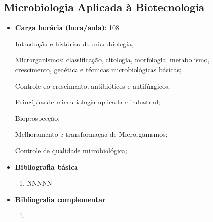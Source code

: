 \documentclass[11pt,fleqn]{book} %
\newcommand{\VER}[1]{\begingroup\color{red}#1\endgroup}
\begin{document}
\subsection{Microbiologia Aplicada à Biotecnologia}\label{disc:microbiologia}
\begin{itemize}
	\item \textbf{Carga horária (hora/aula):} 108
	
%	
%	
%	
%	
%	
%	
%	
	Introdução e histórico da microbiologia; 
	
	Microrganismos: classificação, citologia, morfologia, metabolismo, crescimento,  genética e técnicas microbiológicas básicas;
	
	Controle do crescimento, antibióticos e antifúngicos;
	
	Princípios de microbiologia aplicada e industrial; 
	
	Bioprospecção;
	
	Melhoramento e transformação de Microrganismos; 
		
	Controle de qualidade microbiológica;	
	
	\item \textbf{Bibliografia básica}
	\begin{enumerate}
		\item NNNNN
	\end{enumerate}
	\item \textbf{Bibliografia complementar}
	\begin{enumerate}
		\item 
	\end{enumerate}	
\end{itemize}


\newpage
\end{document}

